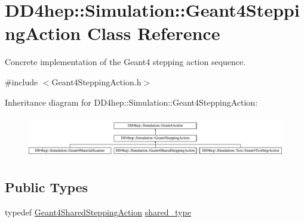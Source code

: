 \hypertarget{class_d_d4hep_1_1_simulation_1_1_geant4_stepping_action}{}\section{D\+D4hep\+:\+:Simulation\+:\+:Geant4\+Stepping\+Action Class Reference}
\label{class_d_d4hep_1_1_simulation_1_1_geant4_stepping_action}


Concrete implementation of the Geant4 stepping action sequence.  




{\ttfamily \#include $<$Geant4\+Stepping\+Action.\+h$>$}

Inheritance diagram for D\+D4hep\+:\+:Simulation\+:\+:Geant4\+Stepping\+Action\+:\begin{figure}[H]
\begin{center}
\leavevmode
\includegraphics[height=1.860465cm]{class_d_d4hep_1_1_simulation_1_1_geant4_stepping_action}
\end{center}
\end{figure}
\subsection*{Public Types}
\begin{DoxyCompactItemize}
\item 
typedef \hyperlink{class_d_d4hep_1_1_simulation_1_1_geant4_shared_stepping_action}{Geant4\+Shared\+Stepping\+Action} \hyperlink{class_d_d4hep_1_1_simulation_1_1_geant4_stepping_action_aa247da84b511779fc413ecb3fbe57125}{shared\+\_\+type}
\end{DoxyCompactItemize}
